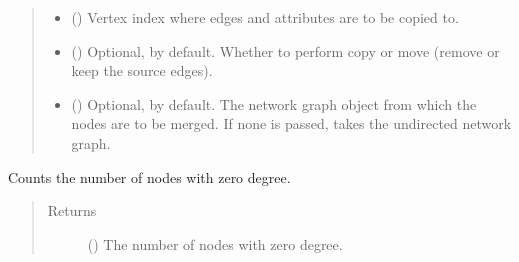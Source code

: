 \documentclass[letterpaper,10pt,english]{sphinxmanual}
\begin{document}
\begin{fulllineitems}
\begin{fulllineitems}
\begin{quote}
\begin{description}
\begin{itemize}
\item {} 
 () \textendash{} Vertex index where edges and attributes are to be copied to.

\item {} 
 () \textendash{} Optional,  by default. Whether to perform copy or
move (remove or keep the source edges).

\item {} 
 () \textendash{} Optional,  by default. The network graph object from
which the nodes are to be merged. If none is passed, takes
the undirected network graph.

\end{itemize}

\end{description}\end{quote}

\end{fulllineitems}


\begin{fulllineitems}
\label{\detokenize{reference:pypath.main.PyPath.count_sol}}
Counts the number of nodes with zero degree.
\begin{quote}\begin{description}
\item[{Returns}] \leavevmode
() \textendash{} The number of nodes with zero degree.

\end{description}\end{quote}

\end{fulllineitems}



\end{fulllineitems}
\end{document}
